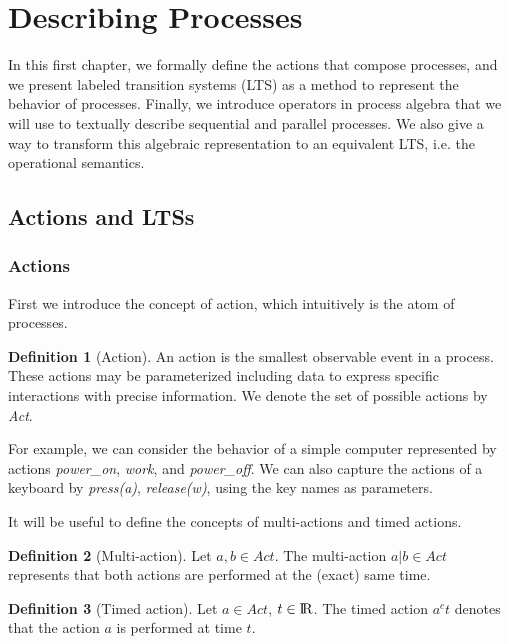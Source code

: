 \documentclass[11pt]{article}
\theoremstyle{definition}
\newtheorem{definition}{Definition}
\theoremstyle{plain}
\begin{document}
\section{Describing Processes}
In this first chapter, we formally define the actions that compose processes, and we present labeled transition systems (LTS) as a method to represent the behavior of processes. Finally, we introduce operators in process algebra that we will use to textually describe sequential and parallel processes. We also give a way to transform this algebraic representation to an equivalent LTS, i.e. the operational semantics.
\subsection{Actions and LTSs}
\subsubsection{Actions}
First we introduce the concept of action, which intuitively is the atom of processes.
\begin{definition} [Action]
	An action is the smallest observable event in a process. These actions may be parameterized including data to express specific interactions with precise information. We denote the set of possible actions by \textit{Act}.
\end{definition}

For example, we can consider the behavior of a simple computer represented by actions \textit{power\_on}, \textit{work}, and \textit{power\_off}. We can also capture the actions of a keyboard by \textit{press(a)}, \textit{release(w)}, using the key names as parameters.

It will be useful to define the concepts of multi-actions and timed actions.
\begin{definition}[Multi-action]
	Let $ a, b\in \textit{Act} $. The multi-action $ a|b \in \textit{Act} $ represents that both actions are performed at the (exact) same time.
\end{definition}
\begin{definition} [Timed action]
	Let $ a \in \textit{Act} $, $ t \in {\rm I\!R} $. The timed action $ a^c t $ denotes that the action $ a $ is performed at time $ t $.
\end{definition}
\end{document}
